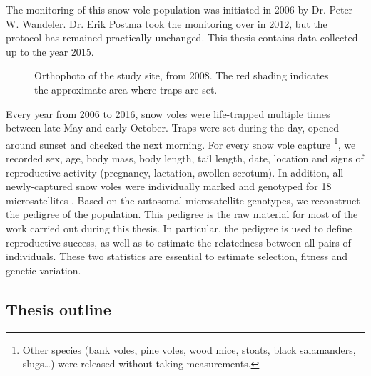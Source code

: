 The monitoring of this snow vole population was initiated in 2006 by Dr. Peter W. Wandeler. Dr. Erik Postma took the monitoring over in 2012, but the protocol has remained practically unchanged. This thesis contains data collected up to the year 2015.
\begin{figure}[ht]
	\caption{Orthophoto of the study site, from 2008. The red shading indicates the approximate area where traps are set.}
	\label{fig:fieldarea}
\end{figure}
Every year from 2006 to 2016, snow voles were life-trapped multiple times between late May and early October. Traps were set during the day, opened around sunset and checked the next morning. 
For every snow vole capture \footnote{Other species (bank voles, pine voles, wood mice, stoats, black salamanders, slugs\dots) were released without taking measurements.}, we recorded sex, age, body mass, body length, tail length, date, location and signs of reproductive activity (pregnancy, lactation, swollen scrotum). 
In addition, all newly-captured snow voles were individually marked and genotyped for 18 microsatellites \cite{Wandeler2008}. Based on the autosomal microsatellite genotypes, we reconstruct the pedigree of the population. This pedigree is the raw material for most of the work carried out during this thesis. In particular, the pedigree is used to define reproductive success, as well as to estimate the relatedness between all pairs of individuals. These two statistics are essential to estimate selection, fitness and genetic variation. 


\subsection{Thesis outline}

\printbibliography[heading=subbibliography]

